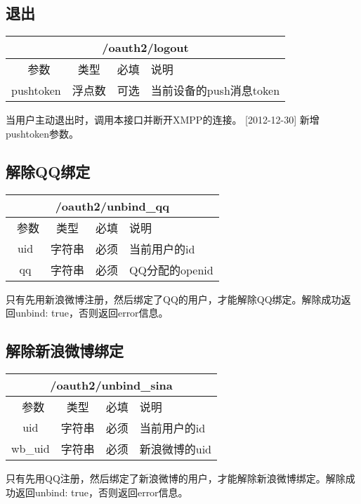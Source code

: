 \documentclass[cs4size]{ctexartutf8}
\begin{document}
\subsection{退出}

\begin{table}[H]
   \begin{center}
\begin{tabular}{|c|c|c|p{12cm}|}
\hline
\multicolumn{4}{|c|}{/oauth2/logout} \\
\hline\hline
 \  参数  & 类型 & 必填 &  说明  \\
\hline
    pushtoken  & 浮点数 & 可选 &  当前设备的push消息token\\
\hline
\end{tabular}
   \end{center}
\end{table}

当用户主动退出时，调用本接口并断开XMPP的连接。
[2012-12-30] 新增pushtoken参数。


\subsection{解除QQ绑定}

\begin{table}[H]
   \begin{center}
\begin{tabular}{|c|c|c|p{12cm}|}
\hline
\multicolumn{4}{|c|}{/oauth2/unbind\_qq} \\
\hline\hline
 \  参数  & 类型 & 必填 &  说明  \\
\hline
    uid  & 字符串 & 必须 &  当前用户的id\\
\hline
    qq  & 字符串 & 必须 &  QQ分配的openid\\    
\hline
\end{tabular}
   \end{center}
\end{table}
只有先用新浪微博注册，然后绑定了QQ的用户，才能解除QQ绑定。解除成功返回{unbind: true}，否则返回error信息。


\subsection{解除新浪微博绑定}

\begin{table}[H]
   \begin{center}
\begin{tabular}{|c|c|c|p{12cm}|}
\hline
\multicolumn{4}{|c|}{/oauth2/unbind\_sina} \\
\hline\hline
 \  参数  & 类型 & 必填 &  说明  \\
\hline
    uid  & 字符串 & 必须 &  当前用户的id\\
\hline
    wb\_uid  & 字符串 & 必须 &  新浪微博的uid\\    
\hline
\end{tabular}
   \end{center}
\end{table}
只有先用QQ注册，然后绑定了新浪微博的用户，才能解除新浪微博绑定。解除成功返回{unbind: true}，否则返回error信息。
\end{document}
